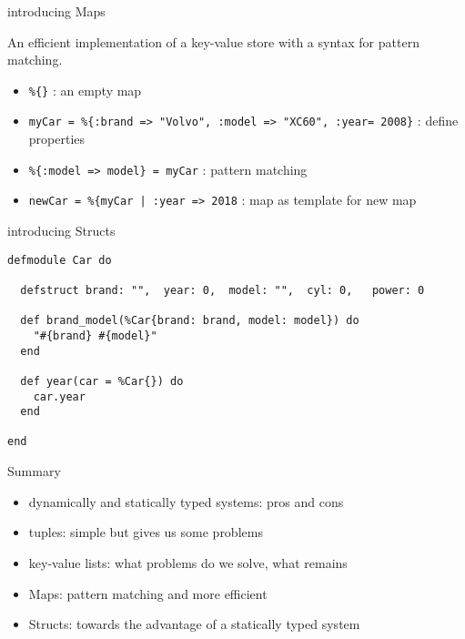 \begin{frame}{introducing Maps}

  An efficient implementation of a key-value store with a syntax for pattern matching. 

  \vspace{10pt}\pause

  \begin{itemize}
  \item {\tt \%\{\}} : an empty map \pause
  \item {\tt myCar = \%\{:brand => "Volvo", :model => "XC60", :year= 2008\}} : define properties \pause
  \item {\tt \%\{:model => model\} = myCar} : pattern matching \pause
  \item {\tt newCar = \%\{myCar | :year => 2018} : map as template for new map
  \end{itemize}
  

  \vspace{20pt}
\end{frame}

\begin{frame}[fragile]{introducing Structs}

\begin{verbatim}
defmodule Car do

  defstruct brand: "",  year: 0,  model: "",  cyl: 0,   power: 0 

  def brand_model(%Car{brand: brand, model: model}) do
    "#{brand} #{model}"
  end

  def year(car = %Car{}) do
    car.year
  end

end
\end{verbatim}

  \vspace{20pt}
  
\end{frame}

\begin{frame}{Summary}

  \begin{itemize}
  \item dynamically and statically typed systems: pros and cons
  \item tuples: simple but gives us some problems
  \item key-value lists: what problems do we solve, what remains
  \item Maps: pattern matching and more efficient
  \item Structs: towards the advantage of a statically typed system
  \end{itemize}
  
\end{frame}







